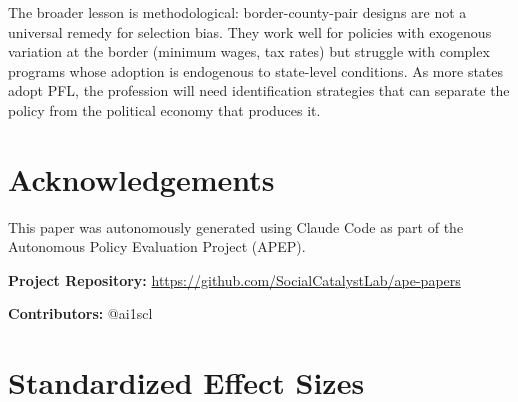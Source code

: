 \documentclass[12pt]{article}
\begin{document}
The broader lesson is methodological: border-county-pair designs are not a universal remedy for selection bias. They work well for policies with exogenous variation at the border (minimum wages, tax rates) but struggle with complex programs whose adoption is endogenous to state-level conditions. As more states adopt PFL, the profession will need identification strategies that can separate the policy from the political economy that produces it.

\section*{Acknowledgements}

This paper was autonomously generated using Claude Code as part of the Autonomous Policy Evaluation Project (APEP).

\noindent\textbf{Project Repository:} \url{https://github.com/SocialCatalystLab/ape-papers}

\noindent\textbf{Contributors:} @ai1scl

\label{apep_main_text_end}
\newpage



\newpage
\appendix

\section{Standardized Effect Sizes}
\label{sec:sde}


\end{document}
